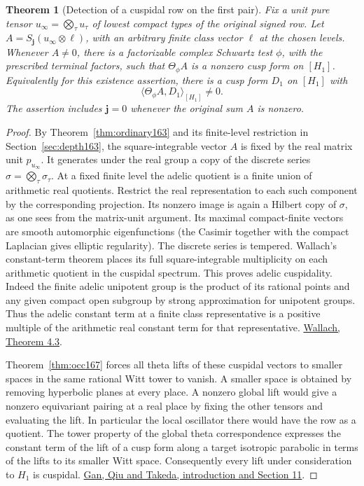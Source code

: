 \documentclass[a4paper,11pt]{article}
\newtheorem{theorem}[proposition]{Theorem}
\theoremstyle{definition}
\theoremstyle{remark}
\numberwithin{equation}{section}
\begin{document}
\begin{theorem}[Detection of a cuspidal row on the first pair]
\leavevmode\label{thm:global167}
Fix a unit pure tensor \(u_\infty=\bigotimes_\tau u_\tau\)
of lowest compact types of the original signed row.
Let \(A=S_{\boldsymbol j}(u_\infty\otimes\ell)\), with an
arbitrary finite class vector \(\ell\) at the chosen levels.
Whenever \(A\ne0\), there is a factorizable complex Schwartz
test \(\phi\), with the prescribed terminal factors, such that
\(\Theta_\phi A\) is a nonzero cusp form on \([H_1]\).
Equivalently for this existence assertion, there is a cusp
form \(D_1\) on \([H_1]\) with
\[
               \langle \Theta_\phi A,D_1\rangle_{[H_1]}\ne0 .
\]
The assertion includes \(\boldsymbol j=0\) whenever the
original sum \(A\) is nonzero.
\end{theorem}
\begin{proof}
By Theorem~\ref{thm:ordinary163} and its finite-level
restriction in Section~\ref{sec:depth163}, the square-integrable
vector \(A\) is fixed by the real matrix unit \(p_{u_\infty}\).
It generates under the real group a copy of the discrete
series \(\sigma=\bigotimes_\tau\sigma_\tau\). At a fixed
finite level the adelic quotient is a finite union of
arithmetic real quotients. Restrict the real representation
to each such component by the corresponding projection.
Its nonzero image is again a Hilbert copy of \(\sigma\),
as one sees from the matrix-unit argument. Its maximal
compact-finite vectors are smooth automorphic eigenfunctions
(the Casimir together with the compact Laplacian gives
elliptic regularity). The discrete series is tempered.
Wallach's constant-term theorem places its full square-integrable
multiplicity on each arithmetic quotient in the cuspidal
spectrum. This proves adelic cuspidality. Indeed the finite
adelic unipotent group is the product of its rational points
and any given compact open subgroup by strong approximation
for unipotent groups. Thus the adelic constant term at a
finite class representative is a positive multiple of the
arithmetic real constant term for that representative.
\href{https://mathweb.ucsd.edu/~nwallach/tempered-cuspidal.pdf}{Wallach,
Theorem 4.3}.

Theorem~\ref{thm:occ167} forces all theta lifts of these
cuspidal vectors to smaller spaces in the same rational Witt
tower to vanish. A smaller space is obtained by removing
hyperbolic planes at every place. A nonzero global lift
would give a nonzero equivariant pairing at a real place by
fixing the other tensors and evaluating the lift. In
particular the local oscillator there would have the row
as a quotient. The tower property of the global theta
correspondence expresses the constant term of the lift of
a cusp form along a target isotropic parabolic in terms of
the lifts to its smaller Witt space. Consequently every
lift under consideration to \(H_1\) is cuspidal.
\href{https://arxiv.org/pdf/1207.4709}{Gan, Qiu and Takeda,
introduction and Section 11}.


\end{proof}
\end{document}
